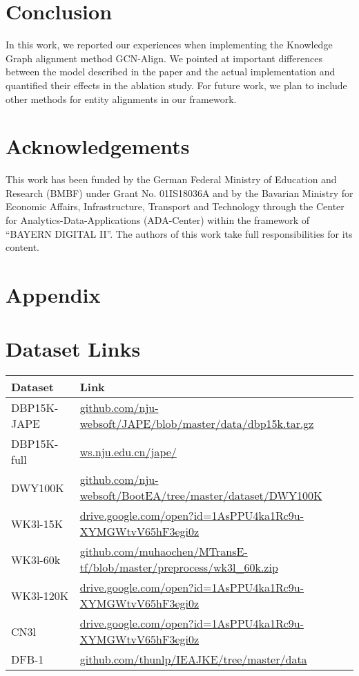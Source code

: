 \documentclass[runningheads]{llncs}
\begin{document}
\section{Conclusion}
In this work, we reported our experiences when implementing the Knowledge Graph alignment method GCN-Align. We pointed at important differences between the model described in the paper and the actual implementation and quantified their effects in the ablation study. 
For future work, we plan to include other methods for entity alignments in our framework.
\section*{Acknowledgements}
This work has been funded by the German Federal Ministry of Education and Research (BMBF) under Grant No. 01IS18036A and by the Bavarian Ministry for Economic Affairs, Infrastructure, Transport and Technology through the Center for Analytics-Data-Applications (ADA-Center) within the framework of “BAYERN DIGITAL II”. The authors of this work take full responsibilities for its content.




\clearpage
\section*{Appendix}
\section*{Dataset Links}
\begin{center}
\begin{tabular}{*{2}{l}}
\toprule
Dataset & Link \\
\midrule
DBP15K-JAPE & \url{github.com/nju-websoft/JAPE/blob/master/data/dbp15k.tar.gz} \\
DBP15K-full & \url{ws.nju.edu.cn/jape/} \\
DWY100K & \url{github.com/nju-websoft/BootEA/tree/master/dataset/DWY100K} \\
WK3l-15K & \url{drive.google.com/open?id=1AsPPU4ka1Rc9u-XYMGWtvV65hF3egi0z} \\
WK3l-60k & \url{github.com/muhaochen/MTransE-tf/blob/master/preprocess/wk3l_60k.zip} \\
WK3l-120K & \url{drive.google.com/open?id=1AsPPU4ka1Rc9u-XYMGWtvV65hF3egi0z} \\
CN3l & \url{drive.google.com/open?id=1AsPPU4ka1Rc9u-XYMGWtvV65hF3egi0z}\\
DFB-1 & \url{github.com/thunlp/IEAJKE/tree/master/data}
\\
\bottomrule
\end{tabular}
\end{center}
\end{document}
